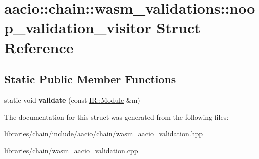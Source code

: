 \hypertarget{structaacio_1_1chain_1_1wasm__validations_1_1noop__validation__visitor}{}\section{aacio\+:\+:chain\+:\+:wasm\+\_\+validations\+:\+:noop\+\_\+validation\+\_\+visitor Struct Reference}
\label{structaacio_1_1chain_1_1wasm__validations_1_1noop__validation__visitor}
\subsection*{Static Public Member Functions}
\begin{DoxyCompactItemize}
\item 
\mbox{\label{structaacio_1_1chain_1_1wasm__validations_1_1noop__validation__visitor_a9576a5229cf24e8808947314f1a55a4b}} 
static void {\bfseries validate} (const \mbox{\hyperlink{struct_i_r_1_1_module}{I\+R\+::\+Module}} \&m)
\end{DoxyCompactItemize}


The documentation for this struct was generated from the following files\+:\begin{DoxyCompactItemize}
\item 
libraries/chain/include/aacio/chain/wasm\+\_\+aacio\+\_\+validation.\+hpp\item 
libraries/chain/wasm\+\_\+aacio\+\_\+validation.\+cpp\end{DoxyCompactItemize}
